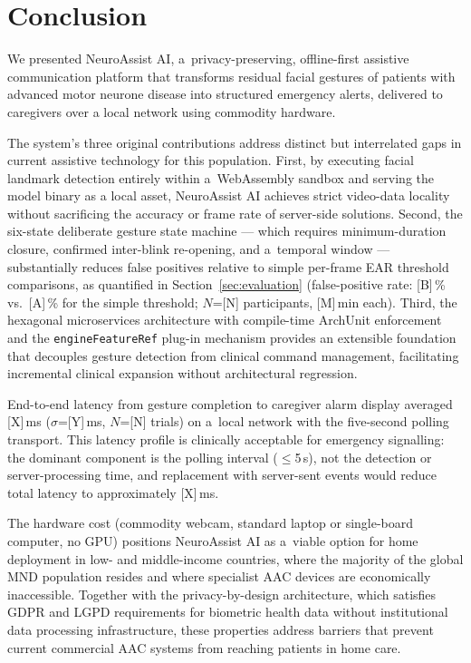 
\section{Conclusion}
\label{sec:conclusion}

We presented NeuroAssist AI, a~privacy-preserving, offline-first assistive
communication platform that transforms residual facial gestures of patients with advanced
motor neurone disease into structured emergency alerts, delivered to caregivers over a
local network using commodity hardware.

The system's three original contributions address distinct but interrelated gaps in
current assistive technology for this population. First, by executing facial landmark
detection entirely within a~WebAssembly sandbox and serving the model binary as a local
asset, NeuroAssist AI achieves strict video-data locality without sacrificing the
accuracy or frame rate of server-side solutions. Second, the six-state deliberate gesture
state machine — which requires minimum-duration closure, confirmed inter-blink
re-opening, and a~temporal window — substantially reduces false positives relative to
simple per-frame EAR threshold comparisons, as quantified in Section~\ref{sec:evaluation}
(false-positive rate: [B]\,\% vs.\ [A]\,\% for the simple threshold; $N$=[N]
participants, [M]\,min each). Third, the hexagonal microservices architecture with
compile-time ArchUnit enforcement and the \texttt{engineFeatureRef} plug-in mechanism
provides an extensible foundation that decouples gesture detection from clinical
command management, facilitating incremental clinical expansion without architectural
regression.

End-to-end latency from gesture completion to caregiver alarm display averaged
[X]\,ms ($\sigma$=[Y]\,ms, $N$=[N] trials) on a~local network with the five-second
polling transport. This latency profile is clinically acceptable for emergency
signalling: the dominant component is the polling interval ($\leq$5\,s), not the
detection or server-processing time, and replacement with server-sent events would
reduce total latency to approximately [X]\,ms.

The hardware cost (commodity webcam, standard laptop or single-board computer, no
GPU) positions NeuroAssist AI as a~viable option for home deployment in low- and
middle-income countries, where the majority of the global MND population resides and
where specialist AAC devices are economically inaccessible. Together with the
privacy-by-design architecture, which satisfies GDPR and LGPD requirements for
biometric health data without institutional data processing infrastructure, these
properties address barriers that prevent current commercial AAC systems from reaching
patients in home care.

